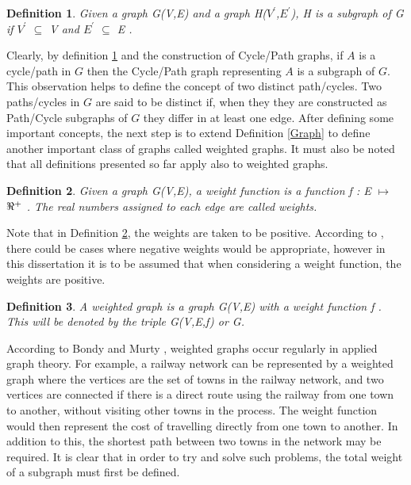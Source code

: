 \documentclass[12pt]{article}
\newtheorem{definition}{Definition}[subsection]
\numberwithin{equation}{subsection}
\numberwithin{table}{subsection}
\numberwithin{algorithm}{subsection}
\begin{document}
\begin{definition}
\label{subgraph}
Given a graph G(V,E) and a graph H($V^\prime$,$E^\prime$), H is a subgraph of G if $V^\prime$ $\subseteq$ V and $E^\prime$ $\subseteq$ E .
\end{definition}
Clearly, by definition \ref{subgraph} and the construction of Cycle/Path graphs, if $A$ is a cycle/path in $G$ then the Cycle/Path graph representing $A$ is a subgraph of $G$. This observation helps to define the concept of two distinct path/cycles. Two paths/cycles in $G$ are said to be distinct if, when they they are constructed as Path/Cycle subgraphs of $G$ they differ in at least one edge. After defining some important concepts, the next step is to extend Definition \ref{Graph} to define another important class of graphs called weighted graphs. It must also be noted that all definitions presented so far apply also to weighted graphs.
\begin{definition}
\label{Weighted Function}
Given a graph G(V,E), a weight function is a function f : E $\mapsto$ $\real^+$ {}. The real numbers assigned to each edge are called weights.
\end{definition}
Note that in Definition \ref{Weighted Function}, the weights are taken to be positive. According to \cite{harris_hirst_mossinghoff_2008}, there could be cases where negative weights would be appropriate, however in this dissertation it is to be assumed that when considering a weight function, the weights are positive.
\begin{definition}
\label{Weighted Graph}
A weighted graph is a graph G(V,E) with a weight function f {}. This will be denoted by the triple G(V,E,f) or G. 
\end{definition}
According to Bondy and Murty \cite{bondy_murty_1982}, weighted graphs occur regularly in applied graph theory. For example, a railway network can be represented by a weighted graph where the vertices are the set of towns in the railway network, and two vertices are connected if there is a direct route using the railway from one town to another, without visiting other towns in the process. The weight function would then represent the cost of travelling directly from one town to another. In addition to this, the shortest path between two towns in the network may be required. It is clear that in order to try and solve such problems, the total weight of a subgraph must first be defined.
\end{document}
